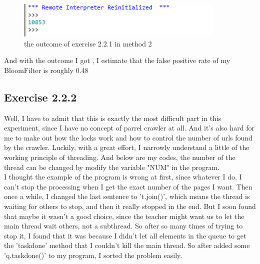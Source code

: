 \documentclass{article}
\begin{document}
\begin{figure}[htbp]
\centering
\includegraphics[width=10cm]{7.png}
\caption{the outcome of exercise 2.2.1 in method 2}
\end{figure}
And with the outcome I got , I estimate that the false positive rate of my BloomFilter is roughly 0.48%
\subsection{Exercise 2.2.2}
Well, I have to admit that this is exactly the most difficult part in this experiment, since I have no concept of parrel crawler at all. And it's also hard for me to make out how the locks work and how to control the number of urls found by the crawler. Luckily, with a great effort, I narrowly understand a little of the working principle of threading. And below are my codes, the number of the thread can be changed by modify the variable "NUM" in the program.\\
I thought the example of the program is wrong at first, since whatever I do, I can't stop the processing when I get the exact number of the pages I want. Then once a while, I changed the last sentence to 't.join()', which means the thread is waiting for others to stop, and then it really stopped in the end. But I soon found that maybe it wasn't a good choice, since the teacher might want us to let the main thread wait others, not a subthread. So after so many times of trying to stop it, I found that it was because I didn't let all elements in the queue to get the 'taskdone' method that I couldn't kill the main thread. So after added some 'q.taskdone()' to my program, I sorted the problem easily.\\
\end{document}
